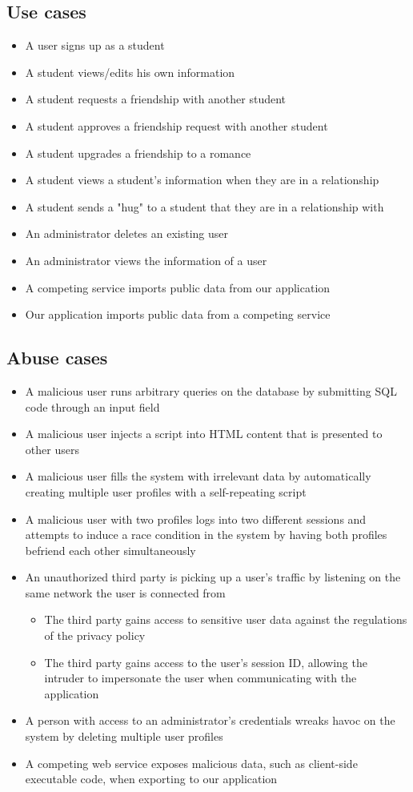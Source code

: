\documentclass[a4paper]{article}
\begin{document}
\subsection{Use cases}
\begin{itemize}
\item A user signs up as a student
\item A student views/edits his own information
\item A student requests a friendship with another student
\item A student approves a friendship request with another student
\item A student upgrades a friendship to a romance
\item A student views a student’s information when they are in a relationship
\item A student sends a "hug" to a student that they are in a relationship with
\item An administrator deletes an existing user
\item An administrator views the information of a user
\item A competing service imports public data from our application
\item Our application imports public data from a competing service
\end{itemize}

\subsection{Abuse cases}
\begin{itemize}
\item A malicious user runs arbitrary queries on the database by submitting SQL code through an input field
\item A malicious user injects a script into HTML content that is presented to other users
\item A malicious user fills the system with irrelevant data by automatically creating multiple user profiles with a self-repeating script
\item A malicious user with two profiles logs into two different sessions and attempts to induce a race condition in the system by having both profiles befriend each other simultaneously
\item An unauthorized third party is picking up a user's traffic by listening on the same network the user is connected from
	\begin{itemize}
		\item The third party gains access to sensitive user data against the regulations of the privacy policy
		\item The third party gains access to the user's session ID, allowing the intruder to impersonate the user when communicating with the application
	\end{itemize}
\item A person with access to an administrator's credentials wreaks havoc on the system by deleting multiple user profiles
\item A competing web service exposes malicious data, such as client-side executable code, when exporting to our application
\end{itemize}
\end{document}
